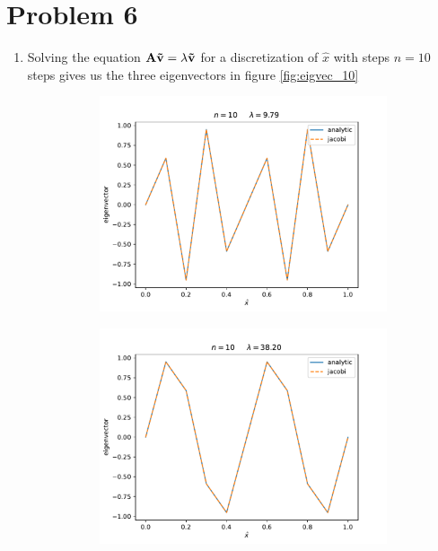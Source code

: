 \documentclass[english,notitlepage]{revtex4-1}  %
\begin{document}
\section*{Problem 6}
\begin{enumerate}[label= \alph*)]
    \item 
    Solving the equation $\bf{A} \vec{v} = \lambda \vec{v}$ for a discretization 
    of $\hat{x}$ with steps $n = 10$ steps gives us the three eigenvectors in figure
    \ref{fig:eigvec_10}

    \begin{figure}[H]
        \begin{subfigure}{.5 \textwidth}
        \centering
        \includegraphics[width=1.12\textwidth]{../figures/eigvec_10_0.pdf}
        \caption{}
        \label{fig:eigvec_10_0}
    \end{subfigure}
    \begin{subfigure}{.5 \textwidth}
        \centering
        \includegraphics[width=1.12\textwidth]{../figures/eigvec_10_1.pdf}
        \caption{}
        \label{fig:eigvec_10_1}
    \end{subfigure}


\end{figure}
\end{enumerate}
\end{document}
